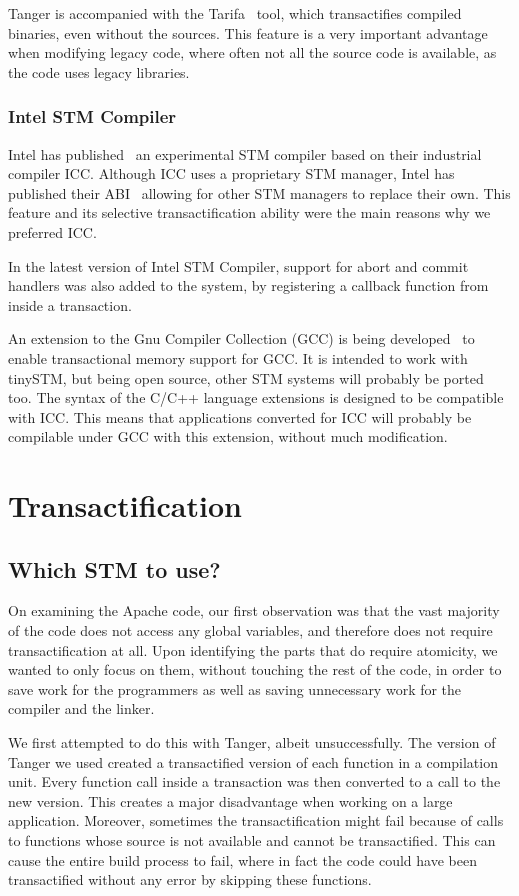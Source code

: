 \documentclass[preprint,11pt]{sigplanconf}
\let \cite = \citep
\begin{document}
{\sc Tanger} is accompanied with the {\sc Tarifa}~\cite{felber2007tanger}
tool, which transactifies compiled binaries, even without the sources. This
feature is a very important advantage when modifying legacy code, where often
not all the source code is available, as the code uses legacy libraries.

\subsubsection{Intel STM Compiler}

Intel has published~\cite{icc} an experimental STM compiler based on their industrial
compiler ICC. Although ICC uses a proprietary STM manager, Intel has published their
ABI~\cite{icc:abi} allowing for other STM managers to replace their own. This feature
and its selective transactification ability were the main reasons why we
preferred ICC.

In the latest version of Intel STM Compiler, support for abort and commit
handlers was also added to the system, by registering a callback function
from inside a transaction.

An extension to the Gnu Compiler Collection (GCC) is being developed~\cite{gcctm} to
enable transactional memory support for GCC. It is intended to work with
tinySTM, but being open source, other STM systems will probably be ported too.
The syntax of the C/C++ language extensions is designed to be compatible with
ICC. This means that applications converted for ICC will probably be compilable
under GCC with this extension, without much modification.

\section{Transactification}\label{sec:transactification}
\subsection{Which STM to use?}

On examining the Apache code, our first observation was that
the vast majority of the code does not access any global variables,
and therefore does not require transactification at all.
Upon identifying the parts that do require atomicity,
we wanted to only focus on them, without touching
the rest of the code, in order to save work for the programmers
as well as saving unnecessary work for the compiler and the linker.

We first attempted to do this with {\sc Tanger}, albeit unsuccessfully.
The version of {\sc Tanger} we used
created a transactified version of each function in a compilation
unit.  Every function call inside a transaction was then converted to a call to
the new version. This creates a major disadvantage when working on a large
application. Moreover, sometimes the
transactification might fail because of calls to functions whose source is not
available and cannot be transactified. This can cause the entire build process
to fail, where in fact the code could have been transactified without any error
by skipping these functions.
\end{document}
